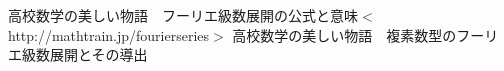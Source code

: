 \documentclass[a4paper]{jsarticle}
\begin{document}
\begin{comment}
\section{フーリエ級数展開からフーリエ変換へ}
複素フーリエ級数展開の係数
\begin{equation}
c_n = \frac { 1 } { T } \int _0 ^T f \left( x \right) \exp \left( - \frac { 2 \pi inx } { T } \right) dx
\end{equation}
について、両辺に$T$をかけて、
\begin{eqnarray}
	c_n T & = & \int _0 ^T f \left( x \right) \exp \left( - \frac { 2 \pi inx } { T } \right) dx \nonumber \\
	& = & \int _0 ^\frac { T } { 2 } f \left( x \right) \exp \left( - \frac { 2 \pi inx } { T } \right) dx + \int _\frac { T } { 2 } ^T f \left( x \right) \exp \left( - \frac { 2 \pi inx } { T } \right) dx \nonumber \\
	& = & \int _0 ^\frac { T } { 2 } f \left( x \right) \exp \left( - \frac { 2 \pi inx } { T } \right) dx + \int _{ - \frac { T } { 2 } } ^0 f \left( x + T \right) \exp \left( - \frac { 2 \pi in \left( x + T \right) } { T } \right) dx \nonumber \\
	& = & \int _0 ^\frac { T } { 2 } f \left( x \right) \exp \left( - \frac { 2 \pi inx } { T } \right) dx + \int _{ - \frac { T } { 2 } } ^0 f \left( x + T \right) \exp \left( - \frac { 2 \pi inx} { T } + 2 \pi in \right) dx \nonumber \\
	& = & \int _0 ^\frac { T } { 2 } f \left( x \right) \exp \left( - \frac { 2 \pi inx } { T } \right) dx + \int _{ - \frac { T } { 2 } } ^0 f \left( x \right) \exp \left( - \frac { 2 \pi inx } { T } \right) dx \nonumber \\
	& = & \int _{ - \frac { T } { 2 } } ^\frac { T } { 2 } f \left( x \right) \exp \left( - \frac { 2 \pi inx } { T } \right) dx
\end{eqnarray}
ここで、$ \omega = \frac { 2 \pi n } { T } $とすると、
\begin{equation}
c_\frac { \omega T } { 2 \pi } = \int _a ^a f \left( x \right) \exp \left( - i \omega x \right) dx
\end{equation}
ここで、今までは波長$ T $の関数$ f \left( x \right) $を想定していたが、この$ T $を無限大に近づけると、
\begin{eqnarray}
	\lim _{ T \to \infty } c_\frac { \omega T } { 2 \pi } & = & \lim _{ T \to \infty } \int _0 ^T f \left( x \right) \exp \left( - i \omega x \right) dx \nonumber \\
	& = & \int _0 ^T f \left( x \right) \exp \left( - i \omega x \right) dx
\end{eqnarray}
\end{comment}
\begin{thebibliography}{9}
	高校数学の美しい物語　フーリエ級数展開の公式と意味$<$http://mathtrain.jp/fourierseries$>$
	高校数学の美しい物語　複素数型のフーリエ級数展開とその導出
\end{thebibliography}
\end{document}
